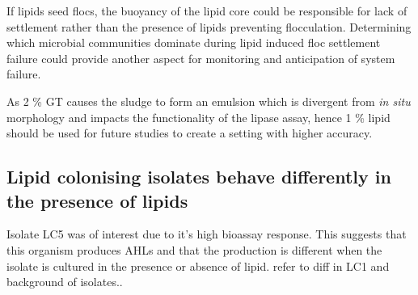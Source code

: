 \documentclass[11pt]{article}
\begin{document}
If lipids seed flocs, the buoyancy of the lipid core could be responsible for lack of settlement rather than the presence of lipids preventing flocculation. Determining which microbial communities dominate during lipid induced floc settlement failure could provide another aspect for monitoring and anticipation of system failure.


As 2 \% GT causes the sludge to form an emulsion which is divergent from \emph{in situ} morphology and impacts the functionality of the lipase assay, hence 1 \% lipid should be used for future studies to create a setting with higher accuracy.

\subsection{Lipid colonising isolates behave differently in the presence of lipids}

Isolate LC5 was of interest due to it's high bioassay response. This suggests that this organism produces AHLs and that the production is different when the isolate is cultured in the presence or absence of lipid.
refer to diff in LC1 and background of isolates.. 

\end{document}
